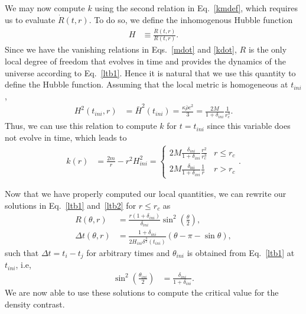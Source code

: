 \documentclass[a4paper,11pt]{article}
\begin{document}
We may now compute $k$ using the second relation in Eq.~\eqref{kmdef}, which requires us to evaluate $\dot{R}(t, r)$. To do so, we define the inhomogenous Hubble function
\begin{align}
\label{hdefltb}
	H &\equiv \frac{\dot{R}(t, r)}{R(t, r)}
	.\end{align}
Since we have the vanishing relations in Eqs.~\eqref{mdot} and \eqref{kdot}, $R$ is the only local degree of freedom that evolves in time and provides the dynamics of the universe according to Eq.~\eqref{ltb1}. Hence it is natural that we use this quantity to define the Hubble function.  Assuming that the local metric is homogeneous at $t_{ini}$,
\begin{align}
\label{hinicond}
	H^2(t_{ini}, r) &= \bar{H}^2(t_{ini}) = \frac{ \kappa \bar{\rho}c^2}{3} = \frac{2 M}{1 +  \delta_{ini}} \frac{1}{r_c^3}
	.\end{align}
Thus, we can use this relation to compute $k$ for $t = t_{ini}$ since this variable does not evolve in time, which leads to
\begin{align}
	k(r) &= \frac{2m}{r} - r^2H^2_{ini}= \left\{\begin{array}{ll}
		2M\frac{\delta_{ini}}{1+\delta_{ini}}\frac{r^2}{r_\mathrm{c}^3}  &r \leq r_c \\
		2M\frac{\delta_\mathrm{ini}}{1+\delta_{ini}}\frac{1}{r}  & r > r_c
	\end{array}\right.
.\end{align}

Now that we have properly computed our local quantities, we can rewrite our solutions in Eq.~\eqref{ltb1} and~\eqref{ltb2} for $r\leq r_c$ as 
\begin{align}
	\label{ltb3}
	R(\theta, r) &= \frac{r (1+\delta_{ini})}{\delta_{ini}}\sin^2\left(\frac{\theta}{2}\right),\\
	\label{ltb4}
	\Delta t(\theta,r ) &= \frac{1 + \delta_{ini}}{2H_{ini}\delta^{\frac{3}{2}}(t_{ini})}\left(\theta - \pi - \sin \theta \right),
\end{align}
such that $\Delta t = t_i - t_j$ for arbitrary times and $\theta_{ini}$ is obtained from Eq.~\eqref{ltb1} at $t_{ini}$, i.e,
\begin{align}
	\label{sintheta}	
 \sin^2\left(\frac{\theta_{ini}}{2}\right) &= \frac{\delta_{ini}}{1 + \delta_{ini}}
	.\end{align}
We are now able to use these solutions to compute the critical value for the density contrast.
\end{document}

